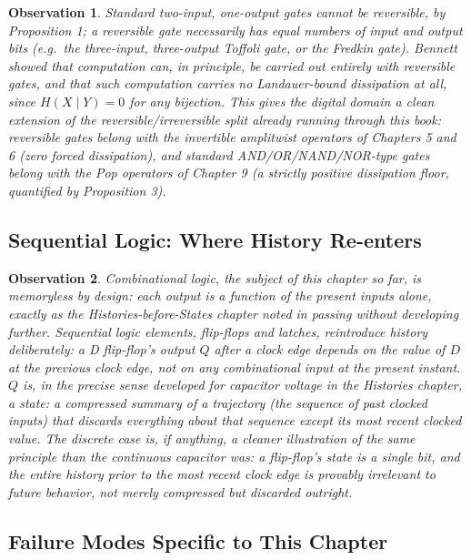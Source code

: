 \documentclass[12pt]{article}
\newtheorem{observation}{Observation}
\begin{document}
\begin{observation}
Standard two-input, one-output gates cannot be reversible, by Proposition 1; a reversible gate necessarily has equal numbers of input and output bits (e.g.\ the three-input, three-output Toffoli gate, or the Fredkin gate). Bennett showed that computation can, in principle, be carried out entirely with reversible gates, and that such computation carries no Landauer-bound dissipation at all, since $H(X\mid Y) = 0$ for any bijection. This gives the digital domain a clean extension of the reversible/irreversible split already running through this book: reversible gates belong with the invertible amplitwist operators of Chapters 5 and 6 (zero forced dissipation), and standard AND/OR/NAND/NOR-type gates belong with the Pop operators of Chapter 9 (a strictly positive dissipation floor, quantified by Proposition 3).
\end{observation}

\subsection{Sequential Logic: Where History Re-enters}

\begin{observation}
Combinational logic, the subject of this chapter so far, is memoryless by design: each output is a function of the present inputs alone, exactly as the Histories-before-States chapter noted in passing without developing further. Sequential logic elements, flip-flops and latches, reintroduce history deliberately: a D flip-flop's output $Q$ after a clock edge depends on the value of $D$ at the previous clock edge, not on any combinational input at the present instant. $Q$ is, in the precise sense developed for capacitor voltage in the Histories chapter, a state: a compressed summary of a trajectory (the sequence of past clocked inputs) that discards everything about that sequence except its most recent clocked value. The discrete case is, if anything, a cleaner illustration of the same principle than the continuous capacitor was: a flip-flop's state is a single bit, and the entire history prior to the most recent clock edge is provably irrelevant to future behavior, not merely compressed but discarded outright.
\end{observation}

\subsection{Failure Modes Specific to This Chapter}
\end{document}
